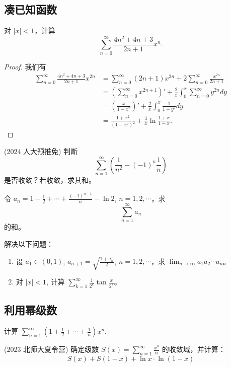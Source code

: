 \documentclass[lang=cn,10pt,thmcnt=section]{elegantbook}
\begin{document}
\subsection{凑已知函数}
\begin{example}
	对 $|x| < 1$，计算
\[
\sum_{n=0}^{\infty} \frac{4n^2 + 4n + 3}{2n+1}x^n.
\]
\end{example}
\begin{proof}
	我们有
\begin{align*}
    \sum_{n=0}^\infty \frac{4n^2+4n+3}{2n+1}x^{2n} &= \sum_{n=0}^\infty (2n+1)x^{2n} + 2\sum_{n=0}^\infty \frac{x^{2n}}{2n+1} \\
    &= \left(\sum_{n=0}^\infty x^{2n+1}\right)' + \frac{2}{x}\int_0^x \sum_{n=0}^\infty y^{2n} dy \\
    &= \left(\frac{x}{1-x^2}\right)' + \frac{2}{x}\int_0^x \frac{1}{1-y^2} dy \\
    &= \frac{1+x^2}{(1-x^2)^2} + \frac{1}{x} \ln\frac{1+x}{1-x}.
\end{align*}
\end{proof}
\begin{example}
	(2024 人大预推免) 判断
\[
\sum_{n=1}^{\infty} \left( \frac{1}{n^2} - (-1)^n \frac{1}{n} \right)
\]
是否收敛？若收敛，求其和。
\end{example}
\begin{example}
	令 $a_n = 1 - \frac{1}{2} + \cdots + \frac{(-1)^{n-1}}{n} - \ln 2$, $n = 1, 2, \cdots$，求
\[
\sum_{n=1}^{\infty} a_n
\]
的和。
\end{example}
\begin{example}
	解决以下问题：
\begin{enumerate}
    \item 设 $a_1 \in (0, 1)$, $a_{n+1} = \sqrt{\frac{1 + a_n}{2}}$, $n = 1, 2, \cdots$，求 $\lim_{n \to \infty} a_1 a_2 \cdots a_n$。
    \item 对 $|x| < 1$, 计算 $\sum_{k=1}^{\infty} \frac{1}{2^k} \tan \frac{x}{2^k}$。
\end{enumerate}
\end{example}
\subsection{利用幂级数}
\begin{example}
	计算 $\sum_{n=1}^{\infty} \left(1 + \frac{1}{2} + \cdots + \frac{1}{n}\right) x^n$.
	\end{example}
	
	\begin{example}
	(2023 北师大夏令营) 确定级数 $S(x) = \sum_{n=1}^{\infty} \frac{x^n}{n}$ 的收敛域，并计算：
	\[
	S(x) + S(1-x) + \ln x \cdot \ln(1-x)
	\]
	\end{example}
	
\end{document}
